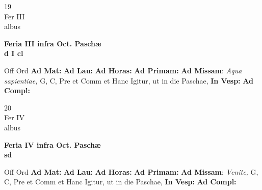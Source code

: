 \documentclass[10pt, openany]{book}
\begin{document}
    \begin{center}
        \begin{minipage}{3.5in}
            \vspace{2em}
            \begin{minipage}{0.5in}
                {\Huge 19} \\
                {\normalsize Fer III} \\
                {\normalsize albus}
            \end{minipage}
            \begin{minipage}{3.0in}
                \textbf{ \large Feria III infra Oct. Paschæ \\
                \textnormal{\normalsize d I cl}} \\ 
            \end{minipage}
            \begin{justify}Off Ord
                \textbf{Ad Mat: }
                \textbf{Ad Lau: }
                \textbf{Ad Horas: }
                \textbf{Ad Primam: }\textbf{Ad Missam}: \textit{Aqua sapientiae,} G, C, Pre et Comm et Hanc Igitur, ut in die Paschae,  
                \textbf{In Vesp: }
                \textbf{Ad Compl: }
            \end{justify}
        \end{minipage}
    \end{center}

    \begin{center}
        \begin{minipage}{3.5in}
            \vspace{2em}
            \begin{minipage}{0.5in}
                {\Huge 20} \\
                {\normalsize Fer IV} \\
                {\normalsize albus}
            \end{minipage}
            \begin{minipage}{3.0in}
                \textbf{ \large Feria IV infra Oct. Paschæ \\
                \textnormal{\normalsize sd}} \\ 
            \end{minipage}
            \begin{justify}Off Ord
                \textbf{Ad Mat: }
                \textbf{Ad Lau: }
                \textbf{Ad Horas: }
                \textbf{Ad Primam: }\textbf{Ad Missam}: \textit{Venite,} G, C, Pre et Comm et Hanc Igitur, ut in die Paschae,  
                \textbf{In Vesp: }
                \textbf{Ad Compl: }
            \end{justify}
        \end{minipage}
    \end{center}
\end{document}
